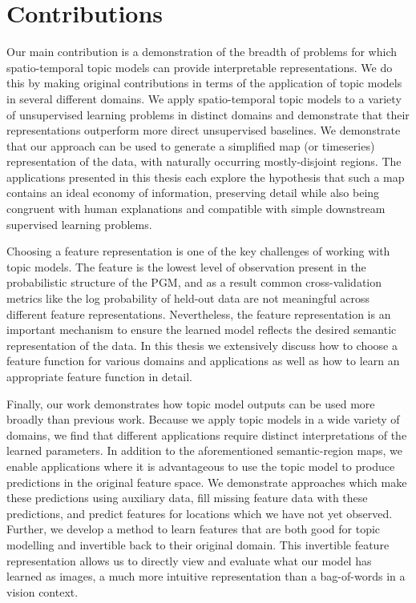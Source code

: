 \section{Contributions}
Our main contribution is a demonstration of the breadth of problems for which spatio-temporal topic models can provide interpretable representations. We do this by making original contributions in terms of the application of topic models in several different domains. We apply spatio-temporal topic models to a variety of unsupervised learning problems in distinct domains and demonstrate that their representations outperform more direct unsupervised baselines. We demonstrate that our approach can be used to generate a simplified map (or timeseries) representation of the data, with naturally occurring mostly-disjoint regions. The applications presented in this thesis each explore the hypothesis that such a map contains an ideal economy of information, preserving detail while also being congruent with human explanations and compatible with simple downstream supervised learning problems.

Choosing a feature representation is one of the key challenges of working with topic models. The feature is the lowest level of observation present in the probabilistic structure of the PGM, and as a result common cross-validation metrics like the log probability of held-out data are not meaningful across different feature representations. Nevertheless, the feature representation is an important mechanism to ensure the learned model reflects the desired semantic representation of the data. In this thesis we extensively discuss how to choose a feature function for various domains and applications as well as how to learn an appropriate feature function in detail.

Finally, our work demonstrates how topic model outputs can be used more broadly than previous work. Because we apply topic models in a wide variety of domains, we find that different applications require distinct interpretations of the learned parameters. In addition to the aforementioned semantic-region maps, we enable applications where it is advantageous to use the topic model to produce predictions in the original feature space. We demonstrate approaches which make these predictions using auxiliary data, fill missing feature data with these predictions, and predict features for locations which we have not yet observed. Further, we develop a method to learn features that are both good for topic modelling and invertible back to their original domain. This invertible feature representation allows us to directly view and evaluate what our model has learned as images, a much more intuitive representation than a bag-of-words in a vision context.

